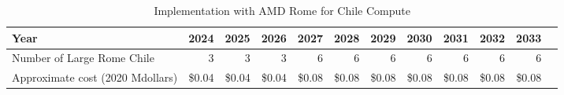 \tiny \begin{longtable} { |p{}  |r  |r  |r  |r  |r  |r  |r  |r  |r  |r  |r |} 
\caption{Implementation with AMD Rome for Chile Compute \label{tab:opsRomeChile}}\\ 
\hline 
\textbf{Year}&\textbf{2024}&\textbf{2025}&\textbf{2026}&\textbf{2027}&\textbf{2028}&\textbf{2029}&\textbf{2030}&\textbf{2031}&\textbf{2032}&\textbf{2033} \\ \hline
{Number of Large Rome  Chile}&{3}&{3}&{3}&{6}&{6}&{6}&{6}&{6}&{6}&{6} \\ \hline
{Approximate cost (2020 Mdollars)}&{\$0.04}&{\$0.04}&{\$0.04}&{\$0.08}&{\$0.08}&{\$0.08}&{\$0.08}&{\$0.08}&{\$0.08}&{\$0.08} \\ \hline
\end{longtable} \normalsize
